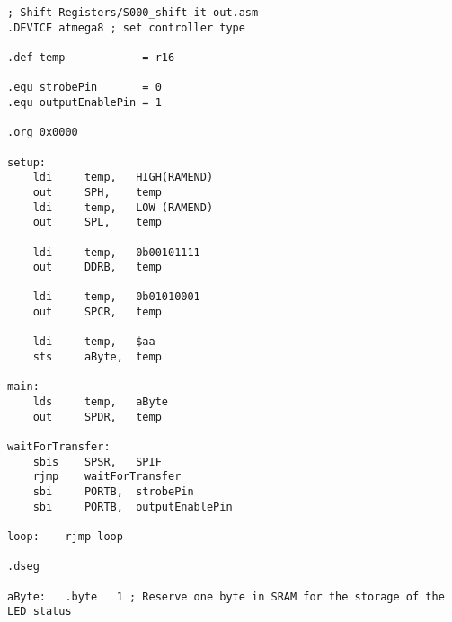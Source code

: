 \begin{lstlisting}
; Shift-Registers/S000_shift-it-out.asm
.DEVICE atmega8 ; set controller type

.def temp            = r16

.equ strobePin       = 0
.equ outputEnablePin = 1

.org 0x0000

setup:
    ldi     temp,   HIGH(RAMEND)
    out     SPH,    temp
    ldi     temp,   LOW (RAMEND)
    out     SPL,    temp

    ldi     temp,   0b00101111
    out     DDRB,   temp

    ldi     temp,   0b01010001
    out     SPCR,   temp

    ldi     temp,   $aa
    sts     aByte,  temp

main:
    lds     temp,   aByte
    out     SPDR,   temp

waitForTransfer:
    sbis    SPSR,   SPIF
    rjmp    waitForTransfer
    sbi     PORTB,  strobePin
    sbi     PORTB,  outputEnablePin

loop:    rjmp loop

.dseg

aByte:   .byte   1 ; Reserve one byte in SRAM for the storage of the LED status
\end{lstlisting}
